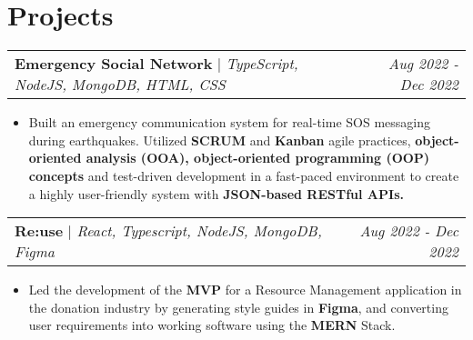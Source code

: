 \documentclass[letterpaper]{article}
\makeatletter
\newcommand{\resumeItemWithoutTitle}[1]{
  \item\small{
    {#1 \vspace{-2pt}}
  }
}
\newcommand{\resumeSubheadingWithoutTitle}[2]{
  \begin{tabular*}{\textwidth}{l@{\extracolsep{\fill}}r}
        \textbf{\textit{#1}} & \textit{\small #2} \\
    \end{tabular*}\vspace{-14pt}
}
\newcommand{\shortSection}[1]{
    \vspace{-6pt}
    \section{#1}
}
\newcommand{\projectHeading}[3]{
  \begin{tabular*}{\textwidth}{l@{\extracolsep{\fill}}r}
        \textbf{#1} 
        \hspace{-2pt} $\vert$ \hspace{-2pt} \small{\textit{#2}} 
        & 
        \textit{#3} \\
    \end{tabular*}\vspace{-2pt}
}
\newcommand{\resumeItemListStart}{\begin{itemize}}
\newcommand{\resumeItemListEnd}{\end{itemize}}
\makeatother
\begin{document}




\shortSection{Projects}
\vspace{3pt}
\projectHeading {{Emergency Social Network}}{ TypeScript, NodeJS, MongoDB, HTML, CSS}{Aug 2022 - Dec 2022}
\resumeItemListStart
\resumeItemWithoutTitle{Built an emergency communication system for real-time SOS messaging during earthquakes. Utilized \textbf{SCRUM} and \textbf{Kanban} agile practices, \textbf{object-oriented analysis (OOA), object-oriented programming (OOP) concepts} and test-driven development in a fast-paced environment to create a highly user-friendly system with \textbf{JSON-based RESTful APIs.}}
\resumeItemListEnd




\vspace{3pt}
\projectHeading {Re:use}{React, Typescript, NodeJS, MongoDB, Figma}{Aug 2022 - Dec 2022}
\resumeItemListStart
\resumeItemWithoutTitle{Led the development of the \textbf{MVP} for a Resource Management application in the donation industry by generating style guides in \textbf{Figma}, and converting user requirements into working software using the \textbf{MERN} Stack.}
\resumeItemListEnd
\end{document}

